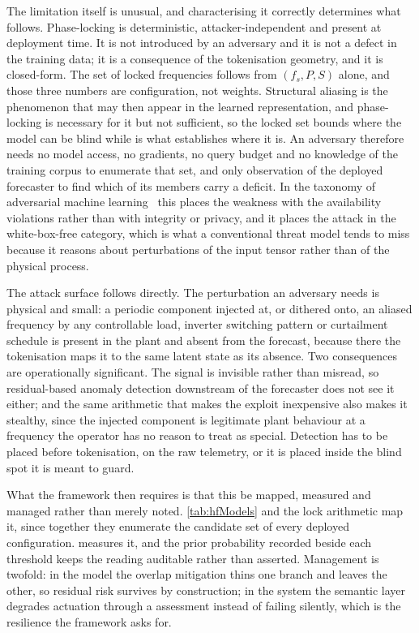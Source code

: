 The limitation itself is unusual, and characterising it correctly determines what follows. Phase-locking is deterministic, attacker-independent and present at deployment time. It is not introduced by an adversary and it is not a defect in the training data; it is a consequence of the tokenisation geometry, and it is closed-form. The set of locked frequencies follows from $(f_s,P,S)$ alone, and those three numbers are configuration, not weights. Structural aliasing is the phenomenon that may then appear in the learned representation, and phase-locking is necessary for it but not sufficient, so the locked set bounds where the model can be blind while  is what establishes where it is. An adversary therefore needs no model access, no gradients, no query budget and no knowledge of the training corpus to enumerate that set, and only observation of the deployed forecaster to find which of its members carry a deficit. In the taxonomy of adversarial machine learning~\autocite{vassilevAdversarialMachineLearning2024} this places the weakness with the availability violations rather than with integrity or privacy, and it places the attack in the white-box-free category, which is what a conventional threat model tends to miss because it reasons about perturbations of the input tensor rather than of the physical process.

The attack surface follows directly. The perturbation an adversary needs is physical and small: a periodic component injected at, or dithered onto, an aliased frequency by any controllable load, inverter switching pattern or curtailment schedule is present in the plant and absent from the forecast, because there the tokenisation maps it to the same latent state as its absence. Two consequences are operationally significant. The signal is invisible rather than misread, so residual-based anomaly detection downstream of the forecaster does not see it either; and the same arithmetic that makes the exploit inexpensive also makes it stealthy, since the injected component is legitimate plant behaviour at a frequency the operator has no reason to treat as special. Detection has to be placed before tokenisation, on the raw telemetry, or it is placed inside the blind spot it is meant to guard.

What the framework then requires is that this be mapped, measured and managed rather than merely noted. \autoref{tab:hfModels} and the lock arithmetic map it, since together they enumerate the candidate set of every deployed configuration.  measures it, and the prior probability recorded beside each threshold keeps the reading auditable rather than asserted. Management is twofold: in the model the overlap mitigation thins one branch and leaves the other, so residual risk survives by construction; in the system the semantic layer degrades actuation through a  assessment instead of failing silently, which is the resilience the framework asks for.

